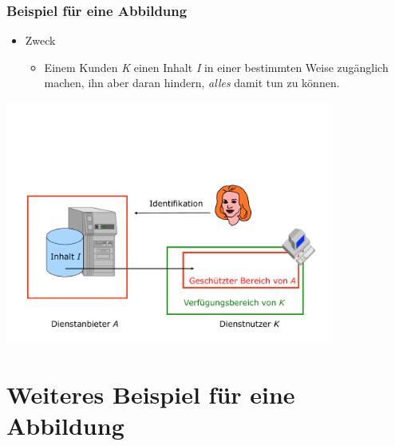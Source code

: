 \begin{frame}
	\transwipe %
	\frametitle{Beispiel für eine Abbildung}
	\begin{itemize}
		\item Zweck
			\begin{itemize}
				\item Einem Kunden \emph{\color[RGB]{0,128,0} K} einen Inhalt \emph{\color{red} I} in einer bestimmten Weise zugänglich machen, ihn aber daran hindern, \emph{alles} damit tun zu können.
			\end{itemize}
	\end{itemize}
	\vspace{\fill}
	\begin{center}
		\includegraphics[width=0.8\textwidth]{pic/abbildung2.pdf}
	\end{center}
\end{frame}

\section{Weiteres Beispiel für eine Abbildung} %

